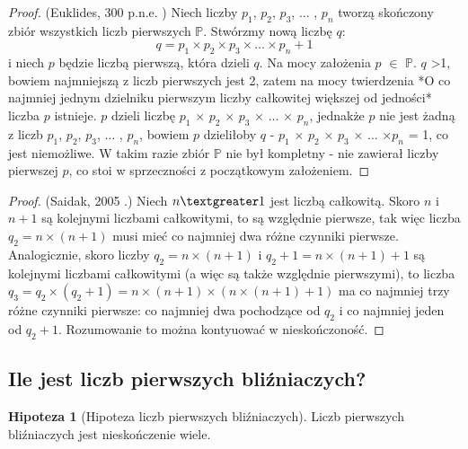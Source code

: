\documentclass[10pt,onecolumn]{article}
\theoremstyle{definition}
\theoremstyle{hypothesis}
\newtheorem{hypothesis}{Hipoteza}
\theoremstyle{capability}
\begin{document}
\begin{proof}
(Euklides, 300 p.n.e. \cite{euklides300bc}) Niech liczby $p_1$, $p_2$, $p_3$, $\ldots$ , $p_n$ tworzą skończony zbiór wszystkich liczb pierwszych $\mathbb{P}$. Stwórzmy nową liczbę $q$: $$ q = p_1 \times p_2 \times p_3 \times \ldots \times p_n + 1$$ i niech $p$ będzie liczbą pierwszą, która dzieli $q$. Na mocy założenia $p$ $\in$ $\mathbb{P}$.
$q$ \textgreater 1, bowiem najmniejszą z liczb pierwszych jest 2, zatem na mocy twierdzenia *O co najmniej jednym dzielniku pierwszym liczby całkowitej większej od jedności* liczba $p$ istnieje. $p$ dzieli liczbę $p_1$ $\times$ $p_2$ $\times$ $p_3$ $\times$ $\ldots$ $\times$ $p_n$, jednakże $p$ nie jest żadną z liczb  $p_1$, $p_2$, $p_3$, $\ldots$ , $p_n$, bowiem $p$ dzieliłoby $q$ - $p_1$ $\times$ $p_2$ $\times$ $p_3$ $\times$ $\ldots$ $\times p_n$ = 1, co jest niemożliwe. W takim razie zbiór $\mathbb{P}$ nie był kompletny - nie zawierał liczby pierwszej $p$, co stoi w sprzeczności z początkowym założeniem.
\end{proof}

\begin{proof}
(Saidak, 2005 \cite{saidak2005}.) Niech $n \textgreater 1$ jest liczbą całkowitą. Skoro $n$ i $n+1$ są kolejnymi liczbami całkowitymi, to są względnie pierwsze, tak więc liczba $q_2 = n \times (n+1)$ musi mieć co najmniej dwa różne czynniki pierwsze. Analogicznie, skoro liczby $q_2 = n \times (n+1)$ i $q_2+1 = n \times  (n+1)+1$ są kolejnymi liczbami całkowitymi (a więc są także względnie pierwszymi), to liczba $q_3 = q_2 \times (q_2+1) = n \times (n+1) \times (n \times (n+1) +1)$ ma co najmniej trzy różne czynniki pierwsze: co najmniej dwa pochodzące od $q_2$ i co najmniej jeden od $q_2+1$. Rozumowanie to można kontyuować w nieskończoność.
\end{proof}

\subsection{Ile jest liczb pierwszych bliźniaczych?}

\begin{hypothesis}[Hipoteza liczb pierwszych bliźniaczych]
Liczb pierwszych bliźniaczych jest nieskończenie wiele.
\label{Twin_primes_hyp}
\end{hypothesis}

\newpage

\end{document}

